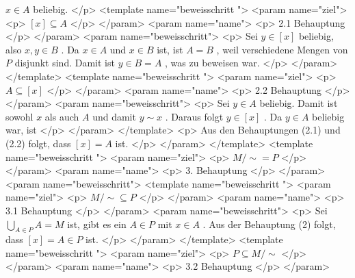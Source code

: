          $x\in A$
         beliebig.
        </p>
        <template name="beweisschritt
 ">
         <param name="ziel">
          <p>
           $[x] \subseteq A$
          </p>
         </param>
         <param name="name">
          <p>
           2.1 Behauptung
          </p>
         </param>
         <param name="beweisschritt">
          <p>
           Sei
           $y\in [x]$
           beliebig, also
           $x,y\in B$
           . Da
           $x\in A$
           und
           $x\in B$
           ist, ist
           $A=B$
           , weil verschiedene Mengen von
           $P$
           disjunkt sind. Damit ist
           $y\in B=A$
           , was zu beweisen war.
          </p>
         </param>
        </template>
        <template name="beweisschritt
 ">
         <param name="ziel">
          <p>
           $A\subseteq [x]$
          </p>
         </param>
         <param name="name">
          <p>
           2.2 Behauptung
          </p>
         </param>
         <param name="beweisschritt">
          <p>
           Sei
           $y\in A$
           beliebig. Damit ist sowohl
           $x$
           als auch
           $A$
           und damit
           $y\sim x$
           . Daraus folgt
           $y\in [x]$
           . Da
           $y\in A$
           beliebig war, ist
          </p>
         </param>
        </template>
        <p>
         Aus den Behauptungen (2.1) und (2.2) folgt, dass
         $[x]=A$
         ist.
        </p>
       </param>
      </template>
      <template name="beweisschritt
 ">
       <param name="ziel">
        <p>
         $M/{\sim} = P$
        </p>
       </param>
       <param name="name">
        <p>
         3. Behauptung
        </p>
       </param>
       <param name="beweisschritt">
        <template name="beweisschritt
 ">
         <param name="ziel">
          <p>
           $M/{\sim} \subseteq P$
          </p>
         </param>
         <param name="name">
          <p>
           3.1 Behauptung
          </p>
         </param>
         <param name="beweisschritt">
          <p>
           Sei
           $\bigcup_{A\in P} A=M$
           ist, gibt es ein
           $A\in P$
           mit
           $x\in A$
           . Aus der Behauptung (2) folgt, dass
           $[x]=A\in P$
           ist.
          </p>
         </param>
        </template>
        <template name="beweisschritt
 ">
         <param name="ziel">
          <p>
           $P \subseteq M/{\sim}$
          </p>
         </param>
         <param name="name">
          <p>
           3.2 Behauptung
          </p>
         </param>
